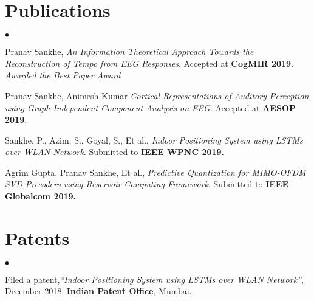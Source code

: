\documentclass[margin,line, 9pt]{res}
\newenvironment{list2}{
  \begin{list}{$\bullet$}{%
      \setlength{\itemsep}{0.03in}
      \setlength{\parsep}{0in} \setlength{\parskip}{0in}
      \setlength{\topsep}{0in} \setlength{\partopsep}{0in} 
      \setlength{\leftmargin}{0.2in}}}{\end{list}}
\begin{document}
\section{\sc Publications}
\begin{list2}
\item Pranav Sankhe, {\em An Information Theoretical Approach Towards the Reconstruction of Tempo from EEG Responses}. Accepted at \textbf{CogMIR 2019}. \emph{Awarded the Best Paper Award}
%
\item Pranav Sankhe, Animesh Kumar {\em Cortical Representations of Auditory Perception using Graph Independent Component Analysis on EEG}. Accepted at \textbf{AESOP 2019}.
%
\item Sankhe, P., Azim, S., Goyal, S., Et al., {\em Indoor Positioning System using LSTMs over WLAN Network}. Submitted to \textbf{IEEE WPNC 2019.}
%
\item Agrim Gupta, Pranav Sankhe, Et al., {\em Predictive Quantization for MIMO-OFDM SVD Precoders using Reservoir Computing Framework}. Submitted to \textbf{IEEE Globalcom 2019.}
%
%
\end{list2}
%
\section{\sc Patents}
\begin{list2}
\item {Filed a patent,\em “Indoor Positioning System using LSTMs over WLAN Network”}, December 2018, \textbf{Indian Patent Office}, Mumbai.
%
\end{list2}
%
%
\end{document}
